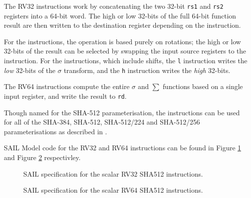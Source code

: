 The RV32 instructions work by concatenating the two 32-bit {\tt rs1} and
{\tt rs2} registers into a 64-bit word.
The high or low 32-bits of the full 64-bit function result are then
written to the destination register depending on the instruction.

For the  instructions, the operation is based
purely on rotations;
the high or low 32-bits of the result can be selected by swapping
the input source registers to the instruction.
For the  instructions, which include shifts,
the {\tt *l} instruction writes the {\em low} 32-bits of the $\sigma$
transform, and the {\tt *h} instruction writes the {\em high} 32-bits.

The RV64 instructions compute the entire $\sigma$ and $\sum$ functions
based on a single input register, and write the result to {\tt rd}.

Though named for the SHA-512 parameterisation, the instructions
can be used for all of the SHA-384, SHA-512, SHA-512/224 and SHA-512/256
parameterisations as described in \cite{nist:fips:180:4}.

SAIL Model code for the RV32 and RV64 instructions can be found in
Figure \ref{fig:sail:ssha512:rv32}
and
Figure \ref{fig:sail:ssha512:rv64}
respectivley.


\begin{figure}[h]

\caption{SAIL specification for the scalar RV32 SHA512 instructions.}
\label{fig:sail:ssha512:rv32}
\end{figure}

\begin{figure}[h]

\caption{SAIL specification for the scalar RV64 SHA512 instructions.}
\label{fig:sail:ssha512:rv64}
\end{figure}
